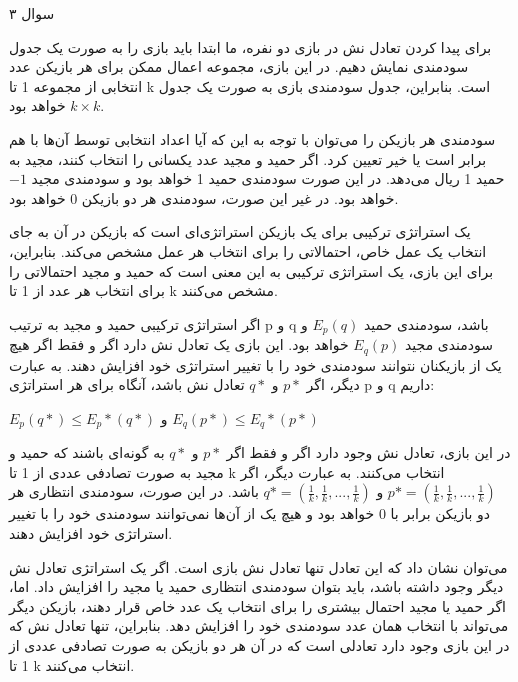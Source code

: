 سوال ۳

برای پیدا کردن تعادل نش در بازی دو نفره، ما ابتدا باید بازی را به صورت یک جدول سودمندی نمایش دهیم. در این بازی، مجموعه اعمال ممکن برای هر بازیکن عدد انتخابی از مجموعه 1 تا k است. بنابراین، جدول سودمندی بازی به صورت یک جدول
$k \times k$
خواهد بود.

سودمندی هر بازیکن را می‌توان با توجه به این که آیا اعداد انتخابی توسط آن‌ها با هم برابر است یا خیر تعیین کرد. اگر حمید و مجید عدد یکسانی را انتخاب کنند، مجید به حمید 1 ریال می‌دهد. در این صورت سودمندی حمید 1 خواهد بود و سودمندی مجید 
$-1$
خواهد بود. در غیر این صورت، سودمندی هر دو بازیکن 0 خواهد بود.

یک استراتژی ترکیبی برای یک بازیکن استراتژی‌ای است که بازیکن در آن به جای انتخاب یک عمل خاص، احتمالاتی را برای انتخاب هر عمل مشخص می‌کند. بنابراین، برای این بازی، یک استراتژی ترکیبی به این معنی است که حمید و مجید احتمالاتی را برای انتخاب هر عدد از 1 تا k مشخص می‌کنند.

اگر استراتژی ترکیبی حمید و مجید به ترتیب p و q باشد، سودمندی حمید
$E_p(q)$
و سودمندی مجید
$E_q(p)$
خواهد بود. این بازی یک تعادل نش دارد اگر و فقط اگر هیچ یک از بازیکنان نتوانند سودمندی خود را با تغییر استراتژی خود افزایش دهند. به عبارت دیگر، اگر 
$p*$
و
$q*$
تعادل نش باشد، آنگاه برای هر استراتژی p و q داریم:

$E_p(q*) \leq E_p*(q*)$ 
و
$E_q(p*) \leq E_q*(p*)$

در این بازی، تعادل نش وجود دارد اگر و فقط اگر
$p*$
و
$q*$
به گونه‌ای باشند که حمید و مجید به صورت تصادفی عددی از 1 تا k انتخاب می‌کنند. به عبارت دیگر، اگر
$p* = (\frac{1}{k}, \frac{1}{k}, ..., \frac{1}{k})$
و
$q* = (\frac{1}{k}, \frac{1}{k}, ..., \frac{1}{k})$
باشد. در این صورت، سودمندی انتظاری هر دو بازیکن برابر با 0 خواهد بود و هیچ یک از آن‌ها نمی‌توانند سودمندی خود را با تغییر استراتژی خود افزایش دهند.

می‌توان نشان داد که این تعادل تنها تعادل نش بازی است. اگر یک استراتژی تعادل نش دیگر وجود داشته باشد، باید بتوان سودمندی انتظاری حمید یا مجید را افزایش داد. اما، اگر حمید یا مجید احتمال بیشتری را برای انتخاب یک عدد خاص قرار دهند، بازیکن دیگر می‌تواند با انتخاب همان عدد سودمندی خود را افزایش دهد. بنابراین، تنها تعادل نش که در این بازی وجود دارد تعادلی است که در آن هر دو بازیکن به صورت تصادفی عددی از 1 تا k انتخاب می‌کنند.

